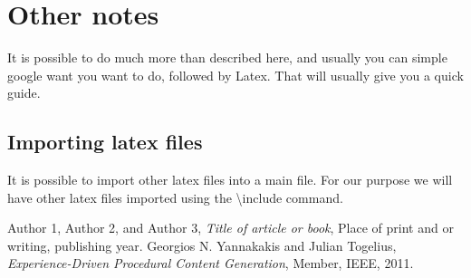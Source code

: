 \documentclass[a4paper,11pt]{article}
\begin{document}
\section{Other notes}
It is possible to do much more than described here, and usually you can simple google want you want to do, followed by Latex. That will usually give you a quick guide.
\subsection{Importing latex files}
It is possible to import other latex files into a main file. For our purpose we will have other latex files imported using the \textbackslash include command.


\begin{thebibliography}{1}

Author 1, Author 2, and Author 3, \emph{Title of article or book}, Place of print and or writing, publishing year.
Georgios N. Yannakakis and Julian Togelius, \emph{Experience-Driven Procedural Content Generation}, Member, IEEE, 2011.
\end{thebibliography}
\end{document}
